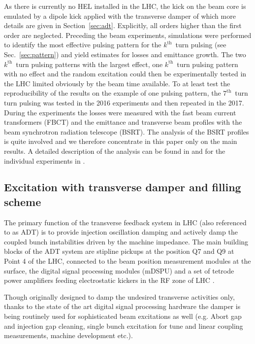 \documentclass[%
 reprint,
 amsmath,amssymb,
 aps,
prstab,
]{revtex4-1}
\begin{document}
As there is currently no HEL installed in the LHC, the kick on the beam core is emulated by a dipole kick applied with the transverse damper of which more details are given in Section~\ref{sec:adt}. Explicitly, all orders higher than the first order are neglected. Preceding the beam experiments, simulations were performed to identify the most effective pulsing pattern for the $k^{\mathrm{th}}$~turn pulsing (see Sec.~\ref{sec:pattern}) and yield estimates for losses and emittance growth. The two $k^{\mathrm{th}}$~turn pulsing patterns with the largest effect, one $k^{\mathrm{th}}$~turn pulsing pattern with no effect and the random excitation could then be experimentally tested in the LHC limited obviously by the beam time available. To at least test the reproducibility of the results on the example of one pulsing pattern, the $7^{\mathrm{th}}$~turn turn pulsing was tested in the 2016 experiments and then repeated in the 2017. During the experiments the losses were measured with the fast beam current transformers (FBCT) and the emittance and transverse beam profiles with the beam synchrotron radiation telescope (BSRT). The analysis of the BSRT profiles is quite involved and we therefore concentrate in this paper only on the main results. A detailed description of the analysis can be found in \cite{bsrtprofinj} and for the individual experiments in \cite{resexmd2016,resexmd2017}.

\subsection{Excitation with transverse damper and filling scheme\label{sec:adt}}
The primary function of the transverse feedback system in LHC (also referenced to as ADT) is to provide injection oscillation damping and actively damp the coupled bunch instabilities driven by the machine impedance. The main building blocks of the ADT system are stipline pickups at the position Q7 and Q9 at Point 4 of the LHC, connected to the beam position measurement modules at the surface, the digital signal processing modules (mDSPU) and a set of tetrode power amplifiers feeding electrostatic kickers in the RF zone of LHC \cite{adt_sum_2008,adt_sum_2011}.

Though originally designed to damp the undesired transverse activities only, thanks to the state of the art digital signal processing hardware the damper is being routinely used for sophisticated beam excitations as well (e.g. Abort gap and injection gap cleaning, single bunch excitation for tune and linear coupling measurements, machine development etc.).
\end{document}
